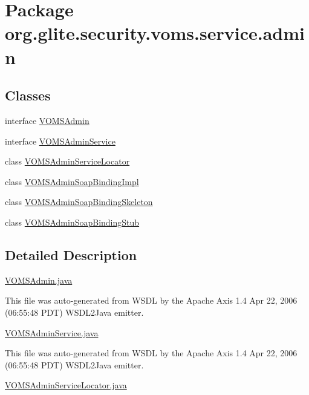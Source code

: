 \hypertarget{namespaceorg_1_1glite_1_1security_1_1voms_1_1service_1_1admin}{
\section{Package org.glite.security.voms.service.admin}
\label{namespaceorg_1_1glite_1_1security_1_1voms_1_1service_1_1admin}
}
\subsection*{Classes}
\begin{DoxyCompactItemize}
\item 
interface \hyperlink{interfaceorg_1_1glite_1_1security_1_1voms_1_1service_1_1admin_1_1VOMSAdmin}{VOMSAdmin}
\item 
interface \hyperlink{interfaceorg_1_1glite_1_1security_1_1voms_1_1service_1_1admin_1_1VOMSAdminService}{VOMSAdminService}
\item 
class \hyperlink{classorg_1_1glite_1_1security_1_1voms_1_1service_1_1admin_1_1VOMSAdminServiceLocator}{VOMSAdminServiceLocator}
\item 
class \hyperlink{classorg_1_1glite_1_1security_1_1voms_1_1service_1_1admin_1_1VOMSAdminSoapBindingImpl}{VOMSAdminSoapBindingImpl}
\item 
class \hyperlink{classorg_1_1glite_1_1security_1_1voms_1_1service_1_1admin_1_1VOMSAdminSoapBindingSkeleton}{VOMSAdminSoapBindingSkeleton}
\item 
class \hyperlink{classorg_1_1glite_1_1security_1_1voms_1_1service_1_1admin_1_1VOMSAdminSoapBindingStub}{VOMSAdminSoapBindingStub}
\end{DoxyCompactItemize}


\subsection{Detailed Description}
\hyperlink{VOMSAdmin_8java}{VOMSAdmin.java}

This file was auto-\/generated from WSDL by the Apache Axis 1.4 Apr 22, 2006 (06:55:48 PDT) WSDL2Java emitter.

\hyperlink{VOMSAdminService_8java}{VOMSAdminService.java}

This file was auto-\/generated from WSDL by the Apache Axis 1.4 Apr 22, 2006 (06:55:48 PDT) WSDL2Java emitter.

\hyperlink{VOMSAdminServiceLocator_8java}{VOMSAdminServiceLocator.java}

